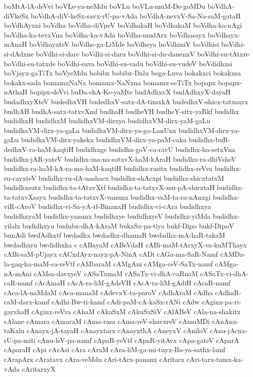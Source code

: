 {boMtA-lA-deVvi
boVLe-ya-neMdu
boVLu
boVLu-muM-De-goMDu
boVdhA-diVkeSx
boVdhA-diV-keSx-savx-rU-pa-vAda
boVdhA-nevxV-Sa-Na-saM-gataH
boVdhAyxni
boVdha
boVdha-diVpeV
boVdhakaH
boVdhakaM
boVdha-ka-nAgi
boVdha-ka-tevxVna
boVdha-ka-vAda
boVdha-mudArx
boVdhasayx
boVdhayx-mAnaH
boVdhayxteV
boVdhe-ga-LiMde
boVdheya
boVdhiniV
boVdhisi
boVdhi-si-dAdxne
boVdhi-si-dare
boVdhi-si-daru
boVdhi-si-du-danenxV
boVdhi-su-tAtxre
boVdhi-su-tatxde
boVdhi-suva
boVdhi-su-vadu
boVdhi-su-vudeV
boVdidhxsi
boVjayx-gaTiTx
boVyeMdu
bobibx
bobibx-Dalu
boga-Luva
bokakxci
bokakxsa
bokakx-sada
bomamxNaNx
bomamx-NaNxna
bomamx-seTiTx
bopapx
bopapx-nAthaH
bopipx-deVvi
buDa-shA-Ke-yaMte
budAdhxvX
budAdhxyX-dayaH
budadhxyXteV
budedhxVH
budedhxV-satx-dA-timxkA
budedhxV-shicx-tatxsayx
budhAH
budhA-satx-tatxvXmf
budhaH
budheYH
budheY-sitx-yaRkf
budidhx
budidhxH
budidhxM
budidhxVM-dirxya
budidhxVM-dirx-yaM-gaLu
budidhxVM-dirx-ya-gaLa
budidhxVM-dirx-ya-ga-LanUnx
budidhxVM-dirx-ya-gaLu
budidhxVM-dirx-yakekx
budidhxVM-dirx-ya-paM-caka
budidhx-buR-dedhxV-ra-haM-kaqtiH
budidhxge
budidhx-goV-ca-ravU
budidhx-ha-setxVna
budidhx-jAR-yateV
budidhx-ma-na-satxvX-haM-kAraH
budidhx-ra-dhiVsheV
budidhx-ra-haM-kA-ra-ma-haM-kaqtiH
budidhx-rasitx
budidhx-reVva
budidhx-ru-cayxteV
budidhx-ru-dA-nashacx
budidhx-shAcxpi
budidhx-shicxtatxM
budidhxsutx
budidhx-ta-tAtxvXtf
budidhx-ta-tatxvX-mu-pA-shirxtaH
budidhx-ta-tatxvXsayx
budidhx-ta-tatxvX-vanunx
budidhx-vaM-ta-ra-nAnxgi
budidhx-viR-cAroV
budidhx-vi-Sa-yA-tf-BinanxH
budidhx-vi-cAra
budidhxya
budidhxyaM
budidhx-yanunx
budidhxye
budidhxyeV
budidhx-yiMda
budidhx-yilalx
budidhxyu
budubx-dhA-kAraM
bukaSx-pa-tiya
bukf-Dipo
bukf-DipoV
bunAdi
bwdAdhxtf
bwdadhx
bwdadhx-dhamaR
bwdadhx-mA-haR-takaM
bwdadhxru
bwdidhxka
c
cABayaM
cABeVdaH
cABi-maM-tArxyX-va-kuMThayx
cABi-saM-pUjayx
cACxdAyx-nayx-pA-NinA
cADi
cAGa-ma-SaR-Namf
cAMDa-la-gaq-ha-maM-ca-reVtf
cAMbaraM
cAMgAni
cAMga-ceV-SaTx-namf
cAMga-nA-mAni
cAMsa-davxyeV
cASaTxmaM
cASaTx-vi-dhA-caRnaM
cASaTx-vi-dhA-caR-namf
cAcAmaH
cAcA-ra-liM-gAdeVH
cAcA-ra-liM-gAdiH
cAcaR-namf
cAca-lA-naMdaM
cAca-manaM
cAdevxY-ta-paroV
cAdhAraM
cAdha
cAdhaR-caM-darx-kamf
cAdhi-Bw-ti-kamf
cAdi-paM-cA-kaSx-rANi
cAdw
cAginx-pa-ri-garxhaH
cAginx-reVva
cAhaM
cAkaSxM
cAkuSxSiV
cAlABeV
cAla-na-shakitx
cAlane
cAmara
cAmaraM
cAma-rasa
cAma-reV-shavxreV
cAmuMDi
cAnAnx-taKxlu
cAnayx-jA-tayaH
cAnayxtarx
cAnayxthA
cAneyxV
cAniloV
cAnu-jAcnx-rU-pa-miti
cAnu-leV-pa-namf
cApaR-yeVtf
cApaR-yitAvx
cApa-gateV
cAparA
cAparaH
cApi
cArAsi
cAra
cAraM
cAra-liM-ga-mi-tuyx-Ba-ya-sathx-lamf
cArapArx
cAratavx
cAra-veMdu
cAri-tArx-pananx
cAritarx
cAri-tarx-tamx-ka-vAda
cAritarxyX
}
